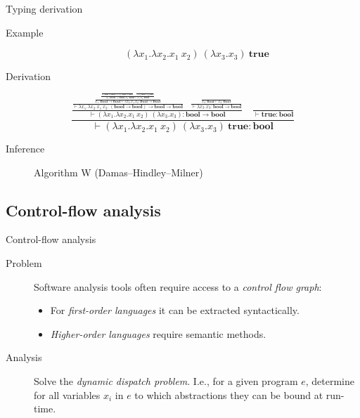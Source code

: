 \documentclass{beamer}
\newcommand{\Abs}[2]{\lambda #1.#2}
\newcommand{\App}[2]{#1\ #2}
\newcommand{\BTrue}{\mathbf{true}}
\newcommand{\TBool}{\mathbf{bool}}
\newcommand{\TFun}[2]{#1 \to #2}
\newcommand{\Judge}[3][\Gamma]{#1 \vdash #2 : #3}
\begin{document}
\begin{frame}{Typing derivation}
	\begin{description}
		\item[Example]
			\[\left(\Abs{x_1}{\Abs{x_2}{\App{x_1}{x_2}}}\right)\ \left(\Abs{x_3}{x_3}\right)\ \BTrue \]
		\item[Derivation]
	\end{description}
	\vspace{1em}
	\begin{equation*}
		\frac{\frac{\frac{\frac{\frac{\frac{}
		                                   {\Judge[x_1 : \TFun{\TBool}{\TBool}, ...]{x_1}{\TFun{\TBool}{\TBool}}}
		                              \quad
		                              \frac{}
		                                   {\Judge[..., x_2 : \TBool]{x_2}{\TBool}}}
		                             {\Judge[x_1 : \TFun{\TBool}{\TBool}, x_2 : \TBool]{\App{x_1}{x_2}}{\TBool}}}
		                       {\Judge[x_1 : \TFun{\TBool}{\TBool}]{\Abs{x_2}{\App{x_1}{x_2}}}{\TFun{\TBool}{\TBool}}}}
		                 {\Judge[]{\Abs{x_1}{\Abs{x_2}{\App{x_1}{x_2}}}}{\TFun{\left(\TFun{\TBool}{\TBool}\right)}{\TFun{\TBool}{\TBool}}}}
		            \quad
		            \frac{\frac{}{\Judge[x_3 : \TBool]{x_3}{\TBool}}}
		                 {\Judge[]{\Abs{x_3}{x_3}}{\TFun{\TBool}{\TBool}}}}
		           {\Judge[]{\left(\Abs{x_1}{\Abs{x_2}{\App{x_1}{x_2}}}\right)\ \left(\Abs{x_3}{x_3}\right)}{\TFun{\TBool}{\TBool}}}
		      \quad
		      \frac{}
		           {\Judge[]{\BTrue}{\TBool}}}
		     {\Judge[]{\left(\Abs{x_1}{\Abs{x_2}{\App{x_1}{x_2}}}\right)\ \left(\Abs{x_3}{x_3}\right)\ \BTrue}{\TBool}}
	\end{equation*}
	\vspace{1em}
	\begin{description}
		\item[Inference] Algorithm W (Damas--Hindley--Milner)
	\end{description}
\end{frame}

\subsection{Control-flow analysis}

\begin{frame}{Control-flow analysis}
	\begin{description}
		\item[Problem] Software analysis tools often require access to a \emph{control flow graph}:
			\begin{itemize}
				\item For \emph{first-order languages} it can be extracted syntactically.
				\item \emph{Higher-order languages} require semantic methods.
			\end{itemize}
		\item[Analysis] Solve the \emph{dynamic dispatch problem}. I.e., for a given program $e$, determine for all variables $x_i$ in $e$ to which abstractions they can be bound at run-time.
	\end{description}
\end{frame}
\end{document}

